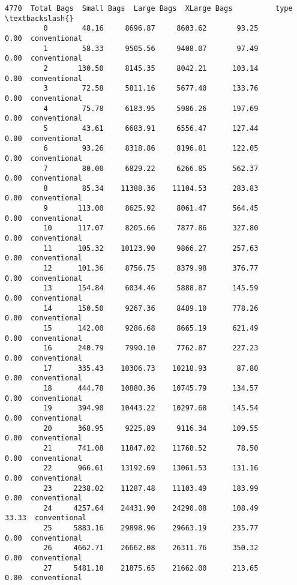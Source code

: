 \documentclass[11pt]{article}
\begin{document}
\begin{Verbatim}[commandchars=\\\{\}]
                   4770  Total Bags  Small Bags  Large Bags  XLarge Bags          type  \textbackslash{}
         0        48.16     8696.87     8603.62       93.25         0.00  conventional   
         1        58.33     9505.56     9408.07       97.49         0.00  conventional   
         2       130.50     8145.35     8042.21      103.14         0.00  conventional   
         3        72.58     5811.16     5677.40      133.76         0.00  conventional   
         4        75.78     6183.95     5986.26      197.69         0.00  conventional   
         5        43.61     6683.91     6556.47      127.44         0.00  conventional   
         6        93.26     8318.86     8196.81      122.05         0.00  conventional   
         7        80.00     6829.22     6266.85      562.37         0.00  conventional   
         8        85.34    11388.36    11104.53      283.83         0.00  conventional   
         9       113.00     8625.92     8061.47      564.45         0.00  conventional   
         10      117.07     8205.66     7877.86      327.80         0.00  conventional   
         11      105.32    10123.90     9866.27      257.63         0.00  conventional   
         12      101.36     8756.75     8379.98      376.77         0.00  conventional   
         13      154.84     6034.46     5888.87      145.59         0.00  conventional   
         14      150.50     9267.36     8489.10      778.26         0.00  conventional   
         15      142.00     9286.68     8665.19      621.49         0.00  conventional   
         16      240.79     7990.10     7762.87      227.23         0.00  conventional   
         17      335.43    10306.73    10218.93       87.80         0.00  conventional   
         18      444.78    10880.36    10745.79      134.57         0.00  conventional   
         19      394.90    10443.22    10297.68      145.54         0.00  conventional   
         20      368.95     9225.89     9116.34      109.55         0.00  conventional   
         21      741.08    11847.02    11768.52       78.50         0.00  conventional   
         22      966.61    13192.69    13061.53      131.16         0.00  conventional   
         23     2238.02    11287.48    11103.49      183.99         0.00  conventional   
         24     4257.64    24431.90    24290.08      108.49        33.33  conventional   
         25     5883.16    29898.96    29663.19      235.77         0.00  conventional   
         26     4662.71    26662.08    26311.76      350.32         0.00  conventional   
         27     5481.18    21875.65    21662.00      213.65         0.00  conventional   

\end{Verbatim}
\end{document}
